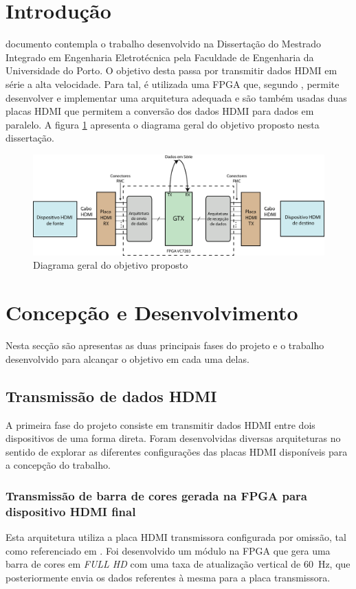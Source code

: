 \documentclass[a4paper]{IEEEtran}
\begin{document}
\section{Introdução}

 documento contempla o trabalho desenvolvido na Dissertação do Mestrado Integrado em Engenharia Eletrotécnica pela Faculdade de Engenharia da Universidade do Porto. 
O objetivo desta passa por transmitir dados HDMI em série a alta velocidade. Para tal, é utilizada uma FPGA que, segundo \cite{R008}, permite desenvolver e implementar uma arquitetura adequada e são também usadas duas placas HDMI que permitem a conversão dos dados HDMI para dados em paralelo. A figura \ref{fig:1} apresenta o diagrama geral do objetivo proposto nesta dissertação.

\begin{figure}[h!]
	\centering
	\includegraphics[width=\linewidth]{diagrama_inicial}
	\caption{Diagrama geral do objetivo proposto}
	\label{fig:1}
\end{figure}

\section{Concepção e Desenvolvimento}
Nesta secção são apresentas as duas principais fases do projeto e o trabalho desenvolvido para alcançar o objetivo em cada uma delas.

\subsection{Transmissão de dados HDMI}
A primeira fase do projeto consiste em transmitir dados HDMI entre dois dispositivos de uma forma direta. Foram desenvolvidas diversas arquiteturas no sentido de explorar as diferentes configurações das placas HDMI disponíveis para a concepção do trabalho.
\\
\subsubsection{Transmissão de barra de cores gerada na FPGA para dispositivo HDMI final}
Esta arquitetura utiliza a placa HDMI transmissora configurada por omissão, tal como referenciado em \cite{R009}. Foi desenvolvido um módulo na FPGA que gera uma barra de cores em \textit{FULL HD} com uma taxa de atualização vertical de \SI{60}{\hertz}, que posteriormente envia os dados referentes à mesma para a placa transmissora. 
\\
\end{document}
